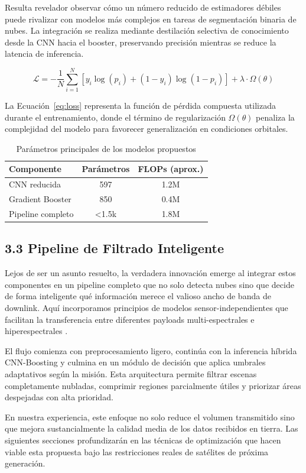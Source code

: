 Resulta revelador observar cómo un número reducido de estimadores débiles puede rivalizar con modelos más complejos en tareas de segmentación binaria de nubes. La integración se realiza mediante destilación selectiva de conocimiento desde la CNN hacia el booster, preservando precisión mientras se reduce la latencia de inferencia. 

\begin{equation}
\mathcal{L} = -\frac{1}{N}\sum_{i=1}^{N} \left[ y_i \log(p_i) + (1-y_i)\log(1-p_i) \right] + \lambda \cdot \Omega(\theta)
\label{eq:loss}
\end{equation}

La Ecuación~\ref{eq:loss} representa la función de pérdida compuesta utilizada durante el entrenamiento, donde el término de regularización \(\Omega(\theta)\) penaliza la complejidad del modelo para favorecer generalización en condiciones orbitales.

\begin{table}[h]
\centering
\caption{Parámetros principales de los modelos propuestos}
\label{tab:model_params}
\begin{tabular}{lcc}
\toprule
Componente & Parámetros & FLOPs (aprox.) \\
\midrule
CNN reducida & 597 & 1.2M \\
Gradient Booster & 850 & 0.4M \\
Pipeline completo & <1.5k & 1.8M \\
\bottomrule
\end{tabular}
\end{table}

\subsection{3.3 Pipeline de Filtrado Inteligente}

Lejos de ser un asunto resuelto, la verdadera innovación emerge al integrar estos componentes en un pipeline completo que no solo detecta nubes sino que decide de forma inteligente qué información merece el valioso ancho de banda de downlink. Aquí incorporamos principios de modelos sensor-independientes que facilitan la transferencia entre diferentes payloads multi-espectrales e hiperespectrales \cite{FastSEnSeI2025}.

El flujo comienza con preprocesamiento ligero, continúa con la inferencia híbrida CNN-Boosting y culmina en un módulo de decisión que aplica umbrales adaptativos según la misión. Esta arquitectura permite filtrar escenas completamente nubladas, comprimir regiones parcialmente útiles y priorizar áreas despejadas con alta prioridad. 

En nuestra experiencia, este enfoque no solo reduce el volumen transmitido sino que mejora sustancialmente la calidad media de los datos recibidos en tierra. Las siguientes secciones profundizarán en las técnicas de optimización que hacen viable esta propuesta bajo las restricciones reales de satélites de próxima generación.